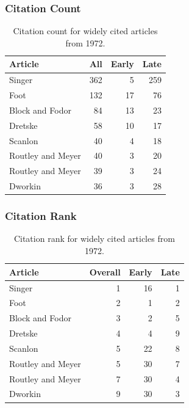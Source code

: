 \documentclass[
  10pt,
  letterpaper,
  DIV=11,
  numbers=noendperiod,
  twoside]{scrartcl}
\begin{document}
\subsubsection*{Citation Count}\label{sec-count-1972}

\begin{longtable}[]{@{}lrrr@{}}

\caption{\label{tbl-citation-count-1972}Citation count for widely cited
articles from 1972.}

\tabularnewline

\toprule\noalign{}
Article & All & Early & Late \\
\midrule\noalign{}
\endhead
\bottomrule\noalign{}
\endlastfoot
Singer & 362 & 5 & 259 \\
Foot & 132 & 17 & 76 \\
Block and Fodor & 84 & 13 & 23 \\
Dretske & 58 & 10 & 17 \\
Scanlon & 40 & 4 & 18 \\
Routley and Meyer & 40 & 3 & 20 \\
Routley and Meyer & 39 & 3 & 24 \\
Dworkin & 36 & 3 & 28 \\

\end{longtable}

\subsubsection*{Citation Rank}\label{sec-rank-1972}

\begin{longtable}[]{@{}lrrr@{}}

\caption{\label{tbl-citation-rank-1972}Citation rank for widely cited
articles from 1972.}

\tabularnewline

\toprule\noalign{}
Article & Overall & Early & Late \\
\midrule\noalign{}
\endhead
\bottomrule\noalign{}
\endlastfoot
Singer & 1 & 16 & 1 \\
Foot & 2 & 1 & 2 \\
Block and Fodor & 3 & 2 & 5 \\
Dretske & 4 & 4 & 9 \\
Scanlon & 5 & 22 & 8 \\
Routley and Meyer & 5 & 30 & 7 \\
Routley and Meyer & 7 & 30 & 4 \\
Dworkin & 9 & 30 & 3 \\

\end{longtable}
\end{document}
